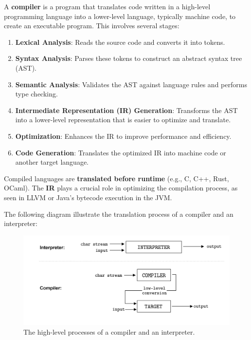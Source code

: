     \begin{Def}[Compiler]
    
    A \textbf{compiler} is a program that translates code written in a high-level programming language into a lower-level language, typically machine code, to create an executable program. This involves several stages:
    
    \begin{enumerate}
        \item \textbf{Lexical Analysis}: Reads the source code and converts it into tokens.
        \item \textbf{Syntax Analysis}: Parses these tokens to construct an abstract syntax tree (AST).
        \item \textbf{Semantic Analysis}: Validates the AST against language rules and performs type checking.
        \item \textbf{Intermediate Representation (IR) Generation}: Transforms the AST into a lower-level representation that is easier to optimize and translate.
        \item \textbf{Optimization}: Enhances the IR to improve performance and efficiency.
        \item \textbf{Code Generation}: Translates the optimized IR into machine code or another target language.
    \end{enumerate}
    
    \noindent
    Compiled languages are \textbf{translated before runtime} (e.g., C, C++, Rust, OCaml). The \textbf{IR} plays a crucial role in optimizing the compilation process, as seen in LLVM or Java’s bytecode execution in the JVM.
    
    \end{Def}
   
\newpage 

\noindent
The following diagram illustrate the translation process of a compiler and an interpreter:

\vspace{2em}

\begin{figure}[h]
    \hspace{-2em}
    \includegraphics[width=1\textwidth]{Sections/Formal/comp.png}
    \caption{The high-level processes of a compiler and an interpreter.}
\end{figure}

